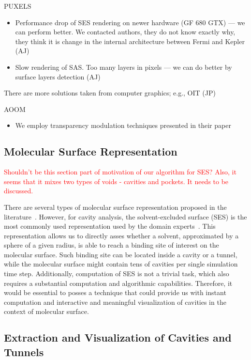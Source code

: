 PUXELS \cite{kauker2013rendering}
\begin{itemize}
  \item Performance drop of SES rendering on newer hardware (GF 680 GTX) --- we can perform better. We contacted authors, they do not know exactly why, they think it is change in the internal architecture between Fermi and Kepler (AJ)
  \item Slow rendering of SAS. Too many layers in pixels --- we can do better by surface layers detection (AJ)
\end{itemize}

There are more solutions taken from computer graphics; e.g., OIT (JP)

AOOM
\begin{itemize}
  \item We employ transparency modulation techniques presented in their paper \cite{borland2011ambient}
\end{itemize}

\subsection{Molecular Surface Representation}
\textcolor{red}{Shouldn't be this section part of motivation of our algorithm for SES? Also, it seems that it mixes two types of voids - cavities and pockets. It needs to be discussed.}

There are several types of molecular surface representation proposed in the literature~\cite{STAR2015}. 
However, for cavity analysis,  the solvent-excluded surface (SES) is the most commonly used representation used by the domain experts~\cite{todo}. 
This representation allows us to directly asses whether a solvent, approximated by a sphere of a given radius, is able to reach a binding site of interest on the molecular surface. 
Such binding site can be located inside a cavity or a tunnel, while the molecular surface might contain tens of cavities per single simulation time step. 
Additionally, computation of SES is not a trivial task, which also requires a substantial computation and algorithmic capabilities. 
Therefore, it would be essential to posses a technique that could provide us with instant computation and interactive and meaningful visualization of cavities in the context of molecular surface.

\subsection{Extraction and Visualization of Cavities and Tunnels}


